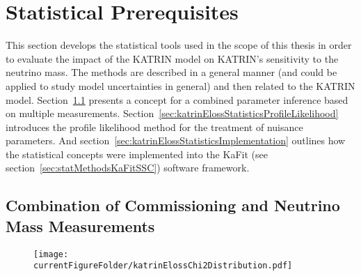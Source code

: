 \def\currentRootFolder{chapter/sensitivityStudyWithPreliminaryKatrinElossModel/statisticalPrerequisites}
\def\currentFigureFolder{\currentRootFolder/fig}



\section{Statistical Prerequisites}
\label{sec:katrinElossStatistics}
This section develops the statistical tools used in the scope of this thesis in order to evaluate the impact of the KATRIN model on KATRIN's sensitivity to the neutrino mass. The methods are described in a general manner (and could be applied to study model uncertainties in general) and then related to the KATRIN model. Section~\ref{sec:katrinElossStatisticsCombMeasurements} presents a concept for a combined parameter inference based on multiple measurements. Section~\ref{sec:katrinElossStatisticsProfileLikelihood} introduces the profile likelihood method for the treatment of nuisance parameters. And section~\ref{sec:katrinElossStatisticsImplementation} outlines how the statistical concepts were implemented into the KaFit (see section~\ref{sec:statMethodsKaFitSSC}) software framework.

\subsection{Combination of Commissioning and Neutrino Mass Measurements}
\label{sec:katrinElossStatisticsCombMeasurements}
\begin{figure}[t]
	\centering
	\texttt{[image: \\currentFigureFolder/katrinElossChi2Distribution.pdf]}
	\xcaption{}{}{}
	\label{fig:katrinElossStatisticsChi2}
\end{figure}



